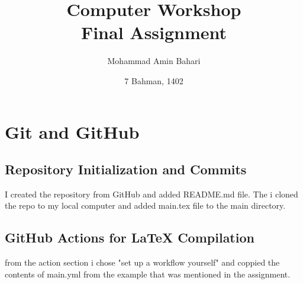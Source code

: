 \documentclass[titlepage]{article}
\title{Computer Workshop \\ Final Assignment}
\author{Mohammad Amin Bahari}
\date{7 Bahman, 1402}
\begin{document}
\maketitle

\tableofcontents
\newpage
\section{Git and GitHub}

\subsection{Repository Initialization and Commits}
I created the repository from GitHub and added README.md file.
The i cloned the repo to my local computer and added main.tex file to the main directory.

\subsection{GitHub Actions for LaTeX Compilation}
from the action section i chose "set up a workflow yourself" and coppied the contents of main.yml from the example that was mentioned in the assignment.
\end{document}
